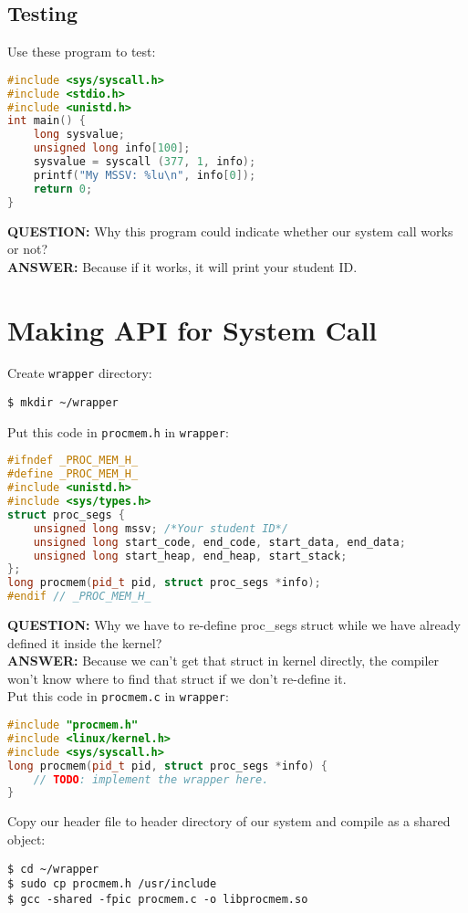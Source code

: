 \documentclass[12pt]{article}
\begin{document}
        \subsection{Testing}
            Use these program to test:
            \begin{lstlisting}[language=C]
#include <sys/syscall.h>
#include <stdio.h>
#include <unistd.h>
int main() {
    long sysvalue;
    unsigned long info[100];
    sysvalue = syscall (377, 1, info);
    printf("My MSSV: %lu\n", info[0]);
    return 0;
}           \end{lstlisting}
            \textbf{QUESTION:} Why this program could indicate whether our system call works or not?\\
            \textbf{ANSWER:} Because if it works, it will print your student ID.
    \section{Making API for System Call}
        Create \texttt{wrapper} directory:
        \begin{lstlisting}
$ mkdir ~/wrapper\end{lstlisting}
        Put this code in \texttt{procmem.h} in \texttt{wrapper}:
        \begin{lstlisting}[language=C++]
#ifndef _PROC_MEM_H_
#define _PROC_MEM_H_
#include <unistd.h>
#include <sys/types.h>
struct proc_segs {
    unsigned long mssv; /*Your student ID*/
    unsigned long start_code, end_code, start_data, end_data;
    unsigned long start_heap, end_heap, start_stack;
};
long procmem(pid_t pid, struct proc_segs *info);
#endif // _PROC_MEM_H_\end{lstlisting}
        \textbf{QUESTION:} Why we have to re-define proc\_segs struct while we 
        have already defined it inside the kernel?\\
        \textbf{ANSWER:} Because we can't get that struct in kernel directly, the compiler won't know 
        where to find that struct if we don't re-define it.\\
        Put this code in \texttt{procmem.c} in \texttt{wrapper}:
        \begin{lstlisting}[language=C++]
#include "procmem.h"
#include <linux/kernel.h>
#include <sys/syscall.h>
long procmem(pid_t pid, struct proc_segs *info) {
    // TODO: implement the wrapper here.
}\end{lstlisting}
        Copy our header file to header directory of our system and compile as a shared object:
        \begin{lstlisting}
$ cd ~/wrapper
$ sudo cp procmem.h /usr/include
$ gcc -shared -fpic procmem.c -o libprocmem.so\end{lstlisting}
\end{document}
